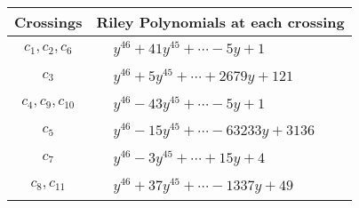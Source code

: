 \documentclass[1p]{elsarticle_modified}
\theoremstyle{definition}
\begin{document}
\begin{tabular}{m{50pt}|m{274pt}}
Crossings & \hspace{64pt}Riley Polynomials at each crossing \\
\hline $$\begin{aligned}c_{1},c_{2},c_{6}\end{aligned}$$&$\begin{aligned}
&y^{46}+41 y^{45}+\cdots-5 y+1
\end{aligned}$\\
\hline $$\begin{aligned}c_{3}\end{aligned}$$&$\begin{aligned}
&y^{46}+5 y^{45}+\cdots+2679 y+121
\end{aligned}$\\
\hline $$\begin{aligned}c_{4},c_{9},c_{10}\end{aligned}$$&$\begin{aligned}
&y^{46}-43 y^{45}+\cdots-5 y+1
\end{aligned}$\\
\hline $$\begin{aligned}c_{5}\end{aligned}$$&$\begin{aligned}
&y^{46}-15 y^{45}+\cdots-63233 y+3136
\end{aligned}$\\
\hline $$\begin{aligned}c_{7}\end{aligned}$$&$\begin{aligned}
&y^{46}-3 y^{45}+\cdots+15 y+4
\end{aligned}$\\
\hline $$\begin{aligned}c_{8},c_{11}\end{aligned}$$&$\begin{aligned}
&y^{46}+37 y^{45}+\cdots-1337 y+49
\end{aligned}$\\
\hline
\end{tabular}
\vskip 2pc
\end{document}
